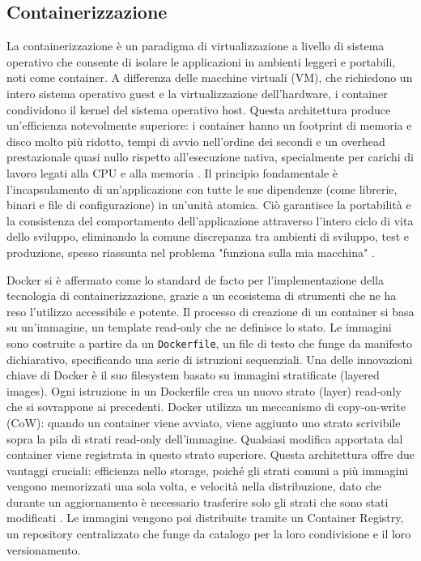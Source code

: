 \documentclass[12pt,a4paper,openright,twoside]{book}
\begin{document}
\subsection{Containerizzazione}
La containerizzazione è un paradigma di virtualizzazione a livello di sistema operativo che consente di isolare le applicazioni in ambienti leggeri e portabili, noti come container. A differenza delle macchine virtuali (VM), che richiedono un intero sistema operativo guest e la virtualizzazione dell'hardware, i container condividono il kernel del sistema operativo host. Questa architettura produce un'efficienza notevolmente superiore: i container hanno un footprint di memoria e disco molto più ridotto, tempi di avvio nell'ordine dei secondi e un overhead prestazionale quasi nullo rispetto all'esecuzione nativa, specialmente per carichi di lavoro legati alla CPU e alla memoria \cite{moravcik2024experimental}. Il principio fondamentale è l'incapsulamento di un'applicazione con tutte le sue dipendenze (come librerie, binari e file di configurazione) in un'unità atomica. Ciò garantisce la portabilità e la consistenza del comportamento dell'applicazione attraverso l'intero ciclo di vita dello sviluppo, eliminando la comune discrepanza tra ambienti di sviluppo, test e produzione, spesso riassunta nel problema "funziona sulla mia macchina" \cite{syrjamaki2023exploring}.

Docker si è affermato come lo standard de facto per l'implementazione della tecnologia di containerizzazione, grazie a un ecosistema di strumenti che ne ha reso l'utilizzo accessibile e potente. Il processo di creazione di un container si basa su un'immagine, un template read-only che ne definisce lo stato. Le immagini sono costruite a partire da un \texttt{Dockerfile}, un file di testo che funge da manifesto dichiarativo, specificando una serie di istruzioni sequenziali. Una delle innovazioni chiave di Docker è il suo filesystem basato su immagini stratificate (layered images). Ogni istruzione in un Dockerfile crea un nuovo strato (layer) read-only che si sovrappone ai precedenti. Docker utilizza un meccanismo di copy-on-write (CoW): quando un container viene avviato, viene aggiunto uno strato scrivibile sopra la pila di strati read-only dell'immagine. Qualsiasi modifica apportata dal container viene registrata in questo strato superiore. Questa architettura offre due vantaggi cruciali: efficienza nello storage, poiché gli strati comuni a più immagini vengono memorizzati una sola volta, e velocità nella distribuzione, dato che durante un aggiornamento è necessario trasferire solo gli strati che sono stati modificati \cite{coha2019evaluating}. Le immagini vengono poi distribuite tramite un Container Registry, un repository centralizzato che funge da catalogo per la loro condivisione e il loro versionamento.
\end{document}
